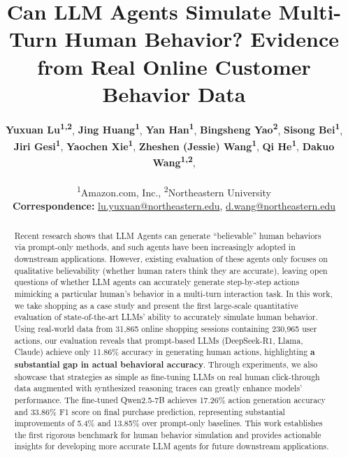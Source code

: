\documentclass{article} %
\title{Can LLM Agents Simulate Multi-Turn Human Behavior? Evidence from Real Online Customer Behavior Data}
\author{
  \textbf{Yuxuan Lu\textsuperscript{1,2}},
  \textbf{Jing Huang\textsuperscript{1}},
  \textbf{Yan Han\textsuperscript{1}},
  \textbf{Bingsheng Yao\textsuperscript{2}},
  \textbf{Sisong Bei\textsuperscript{1}},
\\
  \textbf{Jiri Gesi\textsuperscript{1}},
  \textbf{Yaochen Xie\textsuperscript{1}},
  \textbf{Zheshen (Jessie) Wang\textsuperscript{1}},
  \textbf{Qi He\textsuperscript{1}},
  \textbf{Dakuo Wang\textsuperscript{1,2}},
\\
\\
  \textsuperscript{1}Amazon.com, Inc.,
  \textsuperscript{2}Northeastern University
\\
  \small{
    \textbf{Correspondence:} \href{mailto:lu.yuxuan@northeastern.edu}{lu.yuxuan@northeastern.edu},
    \href{mailto:d.wang@northeastern.edu}{d.wang@northeastern.edu}
  }
}
\begin{document}
\maketitle
\begin{abstract}

Recent research shows that LLM Agents can generate ``believable'' human behaviors via prompt-only methods, and such agents have been increasingly adopted in downstream applications.
However, existing evaluation of these agents only focuses on qualitative believability (whether human raters think they are accurate), leaving open questions of whether LLM agents can accurately generate step-by-step actions mimicking a particular human's behavior in a multi-turn interaction task.
In this work, we take shopping as a case study and present the first large-scale quantitative evaluation of state-of-the-art LLMs' ability to accurately simulate human behavior.
Using real-world data from 31,865 online shopping sessions containing 230,965 user actions, our evaluation reveals that prompt-based LLMs (DeepSeek-R1, Llama, Claude) achieve only 11.86\% accuracy in generating human actions, highlighting \textbf{a substantial gap in actual behavioral accuracy}.
Through experiments, we also showcase that strategies as simple as fine-tuning LLMs on real human click-through data augmented with synthesized reasoning traces can greatly enhance models' performance. The fine-tuned Qwen2.5-7B achieves 17.26\% action generation accuracy and 33.86\% F1 score on final purchase prediction, representing substantial improvements of 5.4\% and 13.85\% over prompt-only baselines.
This work establishes the first rigorous benchmark for human behavior simulation and provides actionable insights for developing more accurate LLM agents for future downstream applications.

\end{abstract}
\end{document}
